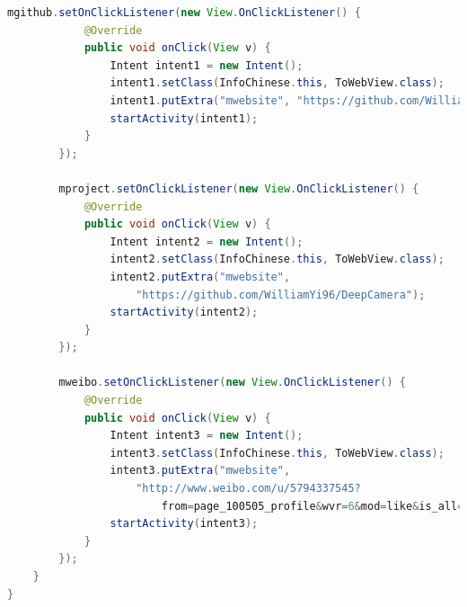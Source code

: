 \documentclass[UTF8, Microsoft YaHei]{book}
\begin{document}
\begin{small}
\begin{lstlisting}[language=java]
        mgithub.setOnClickListener(new View.OnClickListener() {
            @Override
            public void onClick(View v) {
                Intent intent1 = new Intent();
                intent1.setClass(InfoChinese.this, ToWebView.class);
                intent1.putExtra("mwebsite", "https://github.com/WilliamYi96");
                startActivity(intent1);
            }
        });

        mproject.setOnClickListener(new View.OnClickListener() {
            @Override
            public void onClick(View v) {
                Intent intent2 = new Intent();
                intent2.setClass(InfoChinese.this, ToWebView.class);
                intent2.putExtra("mwebsite",
                	"https://github.com/WilliamYi96/DeepCamera");
                startActivity(intent2);
            }
        });

        mweibo.setOnClickListener(new View.OnClickListener() {
            @Override
            public void onClick(View v) {
                Intent intent3 = new Intent();
                intent3.setClass(InfoChinese.this, ToWebView.class);
                intent3.putExtra("mwebsite",
                	"http://www.weibo.com/u/5794337545?
                		from=page_100505_profile&wvr=6&mod=like&is_all=1");
                startActivity(intent3);
            }
        });
    }
}
\end{lstlisting}
\end{small}
\end{document}
